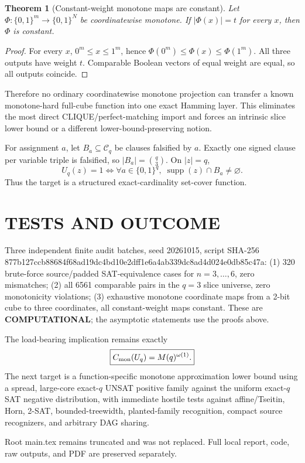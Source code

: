 \documentclass[11pt]{article}
\newtheorem{theorem}{Theorem}
\begin{document}
\begin{theorem}[Constant-weight monotone maps are constant]
Let $\Phi:\{0,1\}^m\to\{0,1\}^N$ be coordinatewise monotone. If $|\Phi(x)|=t$ for every $x$, then $\Phi$ is constant.
\end{theorem}
\begin{proof}
For every $x$, $0^m\le x\le1^m$, hence $\Phi(0^m)\le\Phi(x)\le\Phi(1^m)$. All three outputs have weight $t$. Comparable Boolean vectors of equal weight are equal, so all outputs coincide.
\end{proof}

Therefore no ordinary coordinatewise monotone projection can transfer a known monotone-hard full-cube function into one exact Hamming layer. This eliminates the most direct CLIQUE/perfect-matching import and forces an intrinsic slice lower bound or a different lower-bound-preserving notion.

For assignment $a$, let $B_a\subseteq\mathcal C_q$ be clauses falsified by $a$. Exactly one signed clause per variable triple is falsified, so $|B_a|=\binom q3$. On $|z|=q$,
\[U_q(z)=1\iff \forall a\in\{0,1\}^q,\;\operatorname{supp}(z)\cap B_a\ne\varnothing.\]
Thus the target is a structured exact-cardinality set-cover function.

\section{TESTS AND OUTCOME}
Three independent finite audit batches, seed 20261015, script SHA-256 877b127ccb88684f68ad19dc4bd10e2dff1e6a4ab339dc8ad4d024e0db85c47a: (1) 320 brute-force source/padded SAT-equivalence cases for $n=3,\ldots,6$, zero mismatches; (2) all 6561 comparable pairs in the $q=3$ slice universe, zero monotonicity violations; (3) exhaustive monotone coordinate maps from a 2-bit cube to three coordinates, all constant-weight maps constant. These are \textbf{COMPUTATIONAL}; the asymptotic statements use the proofs above.

The load-bearing implication remains exactly
\[\boxed{C_{\rm mon}(U_q)=M(q)^{\omega(1)}.}\]
The next target is a function-specific monotone approximation lower bound using a spread, large-core exact-$q$ UNSAT positive family against the uniform exact-$q$ SAT negative distribution, with immediate hostile tests against affine/Tseitin, Horn, 2-SAT, bounded-treewidth, planted-family recognition, compact source recognizers, and arbitrary DAG sharing.

Root main.tex remains truncated and was not replaced. Full local report, code, raw outputs, and PDF are preserved separately.
\end{document}
